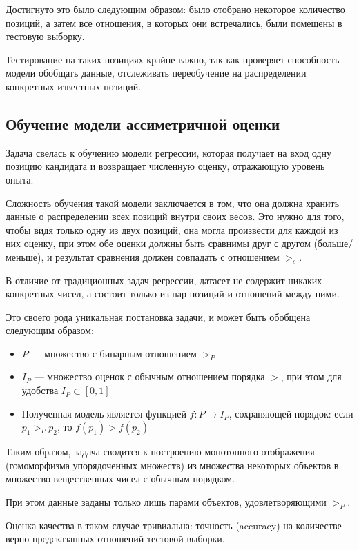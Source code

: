 \documentclass[14pt]{mmcs_article}
\begin{document}
Достигнуто это было следующим образом: было отобрано некоторое количество позиций, а затем все отношения, в которых они встречались, были помещены в тестовую выборку.

Тестирование на таких позициях крайне важно, так как проверяет способность модели обобщать данные, отслеживать переобучение на распределении конкретных известных позиций.

\subsection{Обучение модели ассиметричной оценки}

Задача свелась к обучению модели регрессии, которая получает на вход одну позицию кандидата и возвращает численную оценку, отражающую уровень опыта.

Сложность обучения такой модели заключается в том, что она должна хранить данные о распределении всех позиций внутри своих весов. Это нужно для того, чтобы видя только одну из двух позиций, она могла произвести для каждой из них оценку, при этом обе оценки должны быть сравнимы друг с другом (больше/меньше), и результат сравнения должен совпадать с отношением $>_{s}$.

В отличие от традиционных задач регрессии, датасет не содержит никаких конкретных чисел, а состоит только из пар позиций и отношений между ними.

Это своего рода уникальная постановка задачи, и может быть обобщена следующим образом:

\begin{itemize}
  \item $P$ --- множество с бинарным отношением $>_{P}$
  \item $I_{P}$ --- множество оценок с обычным отношением порядка $>$, при этом для удобства $I_{P} \subset [0, 1]$
  \item Полученная модель является функцией $f: P \rightarrow I_{P}$, сохраняющей порядок: если $p_{1} >_{P} p_{2}$, то $f(p_{1}) > f(p_{2})$
\end{itemize}

Таким образом, задача сводится к построению монотонного отображения (гомоморфизма упорядоченных множеств) из множества некоторых объектов в множество вещественных чисел с обычным порядком.

При этом данные заданы только лишь парами объектов, удовлетворяющими $>_{P}$.

Оценка качества в таком случае тривиальна: точность (accuracy) на количестве верно предсказанных отношений тестовой выборки.
\end{document}
